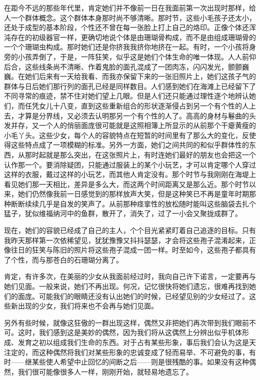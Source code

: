 \par 在距今不远的那些年代里，肯定她们并不像前一日在我面前第一次出现时那样，给人一个群体概念。这个群体本身那时尚不够清晰。那时节，这些小毛孩子还太小，还处于成型的基本阶段，个性还不曾在每一张脸上打上自己的烙印。正像个体还浑沌存在的初级器官一样，更确切地说个体是由珊瑚骨构成，而不是由组成珊瑚骨的一个个珊瑚虫构成。那时她们还是你挤我我挤你地挤在一起。有时，一个小孩将身旁的小孩弄倒了，于是，一阵狂笑，似乎这是她们个体生命的唯一体现。人人前仰后合，这些线条尚不清晰、作着鬼脸的面孔混成了一团肉冻，闪闪发光，颤颤巍巍。在她们后来有一天给我看、而我亦保留下来的一张旧照片上，她们这孩子气的群体与日后她们那行列的面孔已经是同样数目。人们感到她们在海滩上已经留下了不同寻常的痕迹，禁不住对她们望上几眼。但是人们还只能通过理性逐个地辨认她们，而任凭女儿十八变，直到这些重新组合的形状逐渐侵占到另一个有个性的人上去，才算是分界线，又必须去认明那另一个有个性的人了。高高的身材与鬈曲的头发并存，又一个人的俏丽面庞很可能就是这照相簿上所显示的从前那个干瘪黄瘦的小毛丫头。这些少女，每个人的容貌特点在短暂的时间里有了那么大的变化，反使得这些特点成了一项模糊的标准。另外一方面，她们之间共同的和似乎群体性的东西，从那时起就是那么突出，在这张照片上，有时连她们最好的朋友也会把这一个认作那一个。要消除疑团，只能通过服装上的某个小玩艺，才可以肯定哪个人穿过这样的衣服，戴过这样的小玩艺，而其他人肯定没有。那个时节与我刚刚在海堤上看见她们那一天相比，差异是多么大，而这两个时间距离又是那么近。那个时节以来，她们仍然像我前一日感觉到的那样放声大笑，但是这种笑已不再是童年时期那种断断续续几乎是自发的笑声了。从前那种痉挛性的放松随时能叫这些脑袋去扎个猛子，犹似维福纳河中的鱼群，散开了，消失了，过了一小会又聚拢成群了。
\par 现在，她们的容貌已经成了自己的主人，个个目光紧紧盯着自己追逐的目标。只有我昨天那样第一次依稀望见，犹犹豫豫又抖抖瑟瑟，才会将这些孢子混淆起来，正像往日的狂笑与陈旧的照片将这些孢子混成一团一样。时至如今，这些孢子都具有了个性，而与那苍白的石珊瑚分离了。
\par 肯定，有许多次，在美丽的少女从我面前经过时，我向自己许下诺言，一定要再与她们见面。一般来说，她们不再出现。何况，记忆很快将她们遗忘，很难再找到她们的面庞。可能我们的眼睛还没有认出她们的时候，已经望见别的少女经过了。这些新出现的少女，我们将来也不会再与她们见面。
\par 另外有些时候，就像这狂傲的一群出现这样，偶然又非把她们再次带到我们眼前不可。这时，我们感到这是美妙的偶然，因为我们将从这偶然上分辨出似乎机体形成、发育之初以组成我们生命的东西。对于占有某些形象，事后我们会认为这是天注定的，而这种偶然将我们对某些形象的忠诚变成了轻而易举、不可避免的事，有时——继某些使人希望中止回忆的间断之后——则是很残酷的事。如果没有这种偶然，我们很可能像很多人一样，刚刚开始，就轻易地遗忘了。
